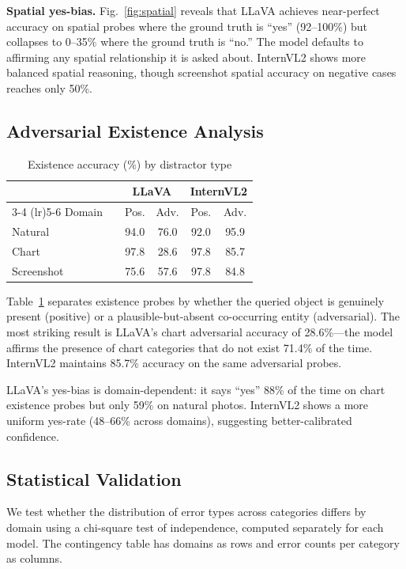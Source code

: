 \documentclass[conference]{IEEEtran}
\begin{document}
\textbf{Spatial yes-bias.} Fig.~\ref{fig:spatial} reveals that LLaVA achieves near-perfect accuracy on spatial probes where the ground truth is ``yes'' (92--100\%) but collapses to 0--35\% where the ground truth is ``no.'' The model defaults to affirming any spatial relationship it is asked about. InternVL2 shows more balanced spatial reasoning, though screenshot spatial accuracy on negative cases reaches only 50\%.

\subsection{Adversarial Existence Analysis}

\begin{table}[t]
\caption{Existence accuracy (\%) by distractor type}
\label{tab:adversarial}
\centering
\small
\begin{tabular}{@{}llcccc@{}}
\toprule
& & \multicolumn{2}{c}{LLaVA} & \multicolumn{2}{c}{InternVL2} \\
\cmidrule(lr){3-4} \cmidrule(lr){5-6}
Domain & & Pos. & Adv. & Pos. & Adv. \\
\midrule
Natural & & 94.0 & 76.0 & 92.0 & 95.9 \\
Chart & & 97.8 & 28.6 & 97.8 & 85.7 \\
Screenshot & & 75.6 & 57.6 & 97.8 & 84.8 \\
\bottomrule
\end{tabular}
\end{table}

Table~\ref{tab:adversarial} separates existence probes by whether the queried object is genuinely present (positive) or a plausible-but-absent co-occurring entity (adversarial). The most striking result is LLaVA's chart adversarial accuracy of 28.6\%---the model affirms the presence of chart categories that do not exist 71.4\% of the time. InternVL2 maintains 85.7\% accuracy on the same adversarial probes.

LLaVA's yes-bias is domain-dependent: it says ``yes'' 88\% of the time on chart existence probes but only 59\% on natural photos. InternVL2 shows a more uniform yes-rate (48--66\% across domains), suggesting better-calibrated confidence.

\subsection{Statistical Validation}

We test whether the distribution of error types across categories differs by domain using a chi-square test of independence, computed separately for each model. The contingency table has domains as rows and error counts per category as columns.
\end{document}
